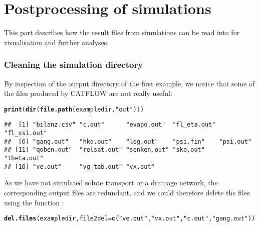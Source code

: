 \documentclass[article,nojss]{jss}\usepackage[]{graphicx}\usepackage[]{xcolor}
\makeatletter
\newcommand{\hlsng}[1]{\textcolor[rgb]{0.192,0.494,0.8}{#1}}%
\newcommand{\hldef}[1]{\textcolor[rgb]{0.345,0.345,0.345}{#1}}%
\newcommand{\hlkwc}[1]{\textcolor[rgb]{0.333,0.667,0.333}{#1}}%
\newcommand{\hlkwd}[1]{\textcolor[rgb]{0.737,0.353,0.396}{\textbf{#1}}}%
\newenvironment{kframe}{%
 \def\at@end@of@kframe{}%
 \ifinner\ifhmode%
  \def\at@end@of@kframe{\end{minipage}}%
  \begin{minipage}{\columnwidth}%
 \fi\fi%
 \def\FrameCommand##1{\hskip\@totalleftmargin \hskip-\fboxsep
 \colorbox{shadecolor}{##1}\hskip-\fboxsep
     \hskip-\linewidth \hskip-\@totalleftmargin \hskip\columnwidth}%
 \MakeFramed {\advance\hsize-\width
   \@totalleftmargin\z@ \linewidth\hsize
   \@setminipage}}%
 {\par\unskip\endMakeFramed%
 \at@end@of@kframe}
\newenvironment{knitrout}{}{} %
\makeatother
\begin{document}

\newpage
\part[Postprocessing of CATFLOW simulations]{Postprocessing of  simulations}
\label{sec:postproc}

This part describes how the result files from  simulations can be read into  for visualisation and further analyses.


\section{Cleaning the simulation directory}


By inspection of the output directory of the first example, we notice that some of 
the files produced by CATFLOW are not really useful:
\begin{knitrout}
\color{fgcolor}\begin{kframe}
\begin{alltt}
\hlkwd{print}\hldef{(}\hlkwd{dir}\hldef{(}\hlkwd{file.path}\hldef{(exampledir,} \hlsng{"out"}\hldef{)))}
\end{alltt}
\begin{verbatim}
##  [1] "bilanz.csv" "c.out"      "evapo.out"  "fl_eta.out" "fl_xsi.out"
##  [6] "gang.out"   "hko.out"    "log.out"    "psi.fin"    "psi.out"   
## [11] "qoben.out"  "relsat.out" "senken.out" "sko.out"    "theta.out" 
## [16] "ve.out"     "vg_tab.out" "vx.out"
\end{verbatim}
\end{kframe}
\end{knitrout}
 As we have not simulated solute transport or a drainage network, the
corresponding output files are redundant, and we could therefore delete the files using the function :

\begin{knitrout}
\color{fgcolor}\begin{kframe}
\begin{alltt}
\hlkwd{del.files}\hldef{(exampledir,} \hlkwc{file2del}\hldef{=}\hlkwd{c}\hldef{(}\hlsng{"ve.out"}\hldef{,} \hlsng{"vx.out"}\hldef{,} \hlsng{"c.out"}\hldef{,} \hlsng{"gang.out"}\hldef{))}
\end{alltt}
\end{kframe}
\end{knitrout}
\end{document}
